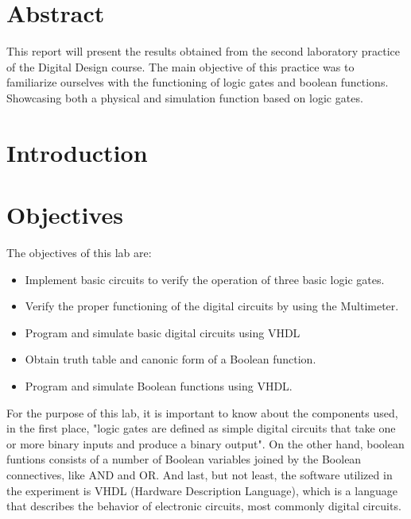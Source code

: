 \documentclass[12pt]{article}  %
\begin{document}
\section{Abstract} %
This report will present the results obtained from the second laboratory practice of the Digital Design course. The main objective of this practice was to familiarize ourselves with the
functioning of logic gates and boolean functions. Showcasing both a physical and simulation function based on logic gates.
\section{Introduction} %

\section{Objectives} %
The objectives of this lab are:
\begin{itemize}
  \item Implement basic circuits to verify the operation of three basic logic gates.
  \item Verify the proper functioning of the digital circuits by using the Multimeter.
  \item Program and simulate basic digital circuits using VHDL
  \item Obtain truth table and canonic form of a Boolean function.
  \item Program and simulate Boolean functions using VHDL.
\end{itemize}
For the purpose of this lab, it is important to know about the components used, in the first place, "logic gates are defined as simple digital circuits that take one or more binary inputs and produce a binary output"\cite{HARRIS20221}.
On the other hand, boolean funtions consists of a number of Boolean variables joined by the Boolean connectives, like AND and OR. \cite{HOLDSWORTH200228}
And last, but not least, the software utilized in the experiment is VHDL (Hardware Description Language), which is a language that describes the behavior of electronic circuits, most commonly digital circuits. \cite{IntelVHDLDef}
\end{document}
